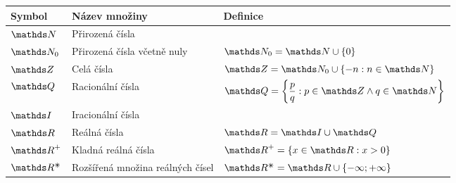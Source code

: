 {
    \def\arraystretch{1.5}
    \begin{tabular}{|lll|}
        \hline
        \textbf{Symbol} &
        \textbf{Název množiny} &
        \textbf{Definice}
        \\ \hline
        $\naturals$
        & Přirozená čísla
        & \\
        $\naturals_0$
        & Přirozená čísla včetně nuly
        & ${ \naturals_0 = \naturals \cup \{ 0 \} }$
        \\
        $\integers$
        & Celá čísla
        & ${ \integers = \naturals_0 \cup \{ -n: n \in \naturals \} }$ \\
        $\rationals$
        & Racionální čísla
        & ${\displaystyle \rationals = \left\{ \frac{p}{q} : p \in \integers \land q \in \naturals \right\} }$
        \\
        $\irrationals$
        & Iracionální čísla
        & \\
        $\reals$
        & Reálná čísla
        & $\reals = \irrationals \cup \rationals$
        \\
        $\positive{\reals}$
        & Kladná reálná čísla
        & ${\displaystyle \positive{\reals} = \left\{ x \in \reals : x > 0 \right\} }$
        \\
        $\extreals$
        & Rozšířená množina reálných čísel
        & ${\extreals = \reals \cup \left\{ -\infty; +\infty \right\}}$
        \\ \hline
    \end{tabular}
}
